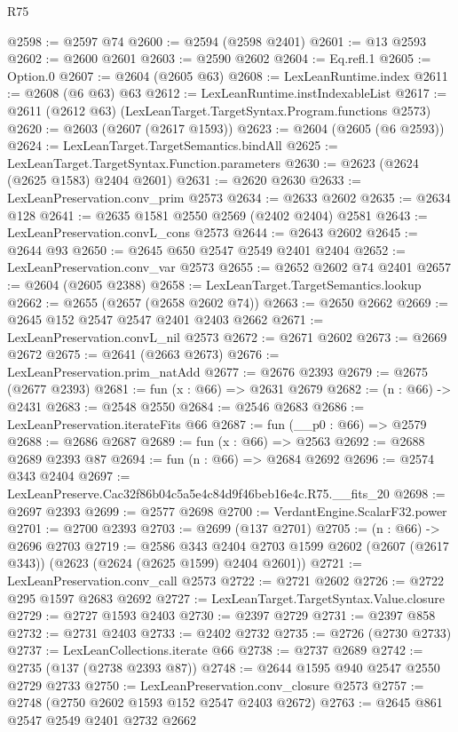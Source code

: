 \begin{lexlean}{R75}
\begin{coremodule}
@2598 := @2597 @74
@2600 := @2594 (@2598 @2401)
@2601 := @13 @2593
@2602 := @2600 @2601
@2603 := @2590 @2602
@2604 := Eq.refl.{1}
@2605 := Option.{0}
@2607 := @2604 (@2605 @63)
@2608 := LexLeanRuntime.index
@2611 := @2608 (@6 @63) @63
@2612 := LexLeanRuntime.instIndexableList
@2617 := @2611 (@2612 @63) (LexLeanTarget.TargetSyntax.Program.functions @2573)
@2620 := @2603 (@2607 (@2617 @1593))
@2623 := @2604 (@2605 (@6 @2593))
@2624 := LexLeanTarget.TargetSemantics.bindAll
@2625 := LexLeanTarget.TargetSyntax.Function.parameters
@2630 := @2623 (@2624 (@2625 @1583) @2404 @2601)
@2631 := @2620 @2630
@2633 := LexLeanPreservation.conv_prim @2573
@2634 := @2633 @2602
@2635 := @2634 @128
@2641 := @2635 @1581 @2550 @2569 (@2402 @2404) @2581
@2643 := LexLeanPreservation.convL_cons @2573
@2644 := @2643 @2602
@2645 := @2644 @93
@2650 := @2645 @650 @2547 @2549 @2401 @2404
@2652 := LexLeanPreservation.conv_var @2573
@2655 := @2652 @2602 @74 @2401
@2657 := @2604 (@2605 @2388)
@2658 := LexLeanTarget.TargetSemantics.lookup
@2662 := @2655 (@2657 (@2658 @2602 @74))
@2663 := @2650 @2662
@2669 := @2645 @152 @2547 @2547 @2401 @2403 @2662
@2671 := LexLeanPreservation.convL_nil @2573
@2672 := @2671 @2602
@2673 := @2669 @2672
@2675 := @2641 (@2663 @2673)
@2676 := LexLeanPreservation.prim_natAdd
@2677 := @2676 @2393
@2679 := @2675 (@2677 @2393)
@2681 := fun (x : @66) => @2631 @2679
@2682 := (n : @66) -> @2431
@2683 := @2548 @2550
@2684 := @2546 @2683
@2686 := LexLeanPreservation.iterateFits @66
@2687 := fun (__p0 : @66) => @2579
@2688 := @2686 @2687
@2689 := fun (x : @66) => @2563
@2692 := @2688 @2689 @2393 @87
@2694 := fun (n : @66) => @2684 @2692
@2696 := @2574 @343 @2404
@2697 := LexLeanPreserve.Cac32f86b04c5a5e4c84d9f46beb16e4c.R75.__fits_20
@2698 := @2697 @2393
@2699 := @2577 @2698
@2700 := VerdantEngine.ScalarF32.power
@2701 := @2700 @2393
@2703 := @2699 (@137 @2701)
@2705 := (n : @66) -> @2696 @2703
@2719 := @2586
    @343
    @2404
    @2703
    @1599
    @2602
    (@2607 (@2617 @343))
    (@2623 (@2624 (@2625 @1599) @2404 @2601))
@2721 := LexLeanPreservation.conv_call @2573
@2722 := @2721 @2602
@2726 := @2722 @295 @1597 @2683 @2692
@2727 := LexLeanTarget.TargetSyntax.Value.closure
@2729 := @2727 @1593 @2403
@2730 := @2397 @2729
@2731 := @2397 @858
@2732 := @2731 @2403
@2733 := @2402 @2732
@2735 := @2726 (@2730 @2733)
@2737 := LexLeanCollections.iterate @66
@2738 := @2737 @2689
@2742 := @2735 (@137 (@2738 @2393 @87))
@2748 := @2644 @1595 @940 @2547 @2550 @2729 @2733
@2750 := LexLeanPreservation.conv_closure @2573
@2757 := @2748 (@2750 @2602 @1593 @152 @2547 @2403 @2672)
@2763 := @2645 @861 @2547 @2549 @2401 @2732 @2662

\end{coremodule}
\end{lexlean}
